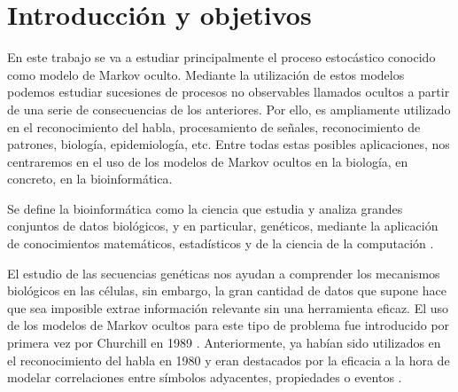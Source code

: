 \chapter*{Introducción y objetivos}

En este trabajo se va a estudiar principalmente el proceso estocástico conocido como modelo de Markov oculto. Mediante la utilización de estos modelos podemos estudiar sucesiones de procesos no observables llamados ocultos a partir de una serie de consecuencias de los anteriores. Por ello, es ampliamente utilizado en el reconocimiento del habla, procesamiento de señales, reconocimiento de patrones, biología, epidemiología, etc. Entre todas estas posibles aplicaciones, nos centraremos en el uso de los modelos de Markov ocultos en la biología, en concreto, en la bioinformática. 

Se define la bioinformática como la ciencia que estudia y analiza grandes conjuntos de datos biológicos, y en particular, genéticos, mediante la aplicación de conocimientos matemáticos, estadísticos y de la ciencia de la computación \cite{Warren}. 

El estudio de las secuencias genéticas nos ayudan a comprender los mecanismos biológicos en las células, sin embargo, la gran cantidad de datos que supone hace que sea imposible extrae información relevante sin una herramienta eficaz. El uso de los modelos de Markov ocultos para este tipo de problema fue introducido por primera vez por Churchill en 1989 \cite{Churchill}. Anteriormente, ya habían sido utilizados en el reconocimiento del habla en 1980 \cite{Ferguson} y eran destacados por la eficacia a la hora de modelar correlaciones entre símbolos adyacentes, propiedades o eventos \cite{Yoon}. 